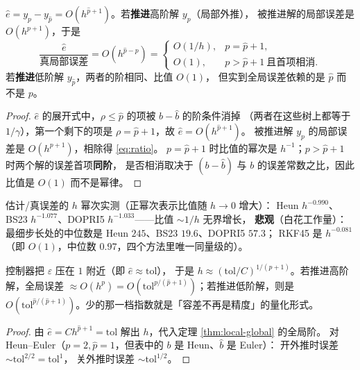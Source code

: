 \begin{theorem}[估计量估的是谁]
\label{thm:estimator-order}
$\hat e=y_p-y_{\hat p}=O(h^{\hat p+1})$。若\textbf{推进}高阶解 $y_p$（局部外推），
被推进解的局部误差是 $O(h^{p+1})$，于是
\begin{equation}
  \frac{\hat e}{\text{真局部误差}}=O(h^{\hat p-p})=
  \begin{cases}O(1/h),& p=\hat p+1,\\ O(1),& p>\hat p+1\ \text{且首项相消}.\end{cases}
  \label{eq:ratio}
\end{equation}
若\textbf{推进}低阶解 $y_{\hat p}$，两者的阶相同、比值 $O(1)$，
但实到全局误差依赖的是 $\hat p$ 而不是 $p$。
\end{theorem}

\begin{proof}
$\hat e$ 的展开式中，$\rho\le\hat p$ 的项被 $b-\hat b$ 的阶条件消掉
（两者在这些树上都等于 $1/\gamma$），第一个剩下的项是 $\rho=\hat p+1$，故 $\hat e=O(h^{\hat p+1})$。
被推进解 $y_p$ 的局部误差是 $O(h^{p+1})$，相除得 \eqref{eq:ratio}。
$p=\hat p+1$ 时比值的幂次是 $h^{-1}$；$p>\hat p+1$ 时两个解的误差首项\textbf{同阶}，
是否相消取决于 $(b-\hat b)$ 与 $b$ 的误差常数之比，因此比值是 $O(1)$ 而不是幂律。
\end{proof}

\begin{remark}[实测：两种比值]
估计/真误差的 $h$ 幂次实测（正幂次表示比值随 $h\to0$ 增大）：
Heun $h^{-0.990}$、BS23 $h^{-1.077}$、DOPRI5 $h^{-1.033}$——比值 $\sim1/h$ 无界增长，
\textbf{悲观}（白花工作量）：最细步长处的中位数是 Heun $245$、BS23 $19.6$、DOPRI5 $57.3$；
RKF45 是 $h^{-0.081}$（即 $O(1)$，中位数 $0.97$，四个方法里唯一同量级的）。
\end{remark}

\begin{theorem}
\label{thm:tol-scaling}
控制器把 $\varepsilon$ 压在 $1$ 附近（即 $\hat e\approx\mathrm{tol}$），
于是 $h\approx(\mathrm{tol}/C)^{1/(\hat p+1)}$。若推进高阶解，全局误差
$\approx O(h^{p})=O(\mathrm{tol}^{p/(\hat p+1)})$；若推进低阶解，则是
$O(\mathrm{tol}^{\hat p/(\hat p+1)})$。少的那一档指数就是「容差不再是精度」的量化形式。
\end{theorem}

\begin{proof}
由 $\hat e=Ch^{\hat p+1}=\mathrm{tol}$ 解出 $h$，代入定理 \ref{thm:local-global} 的全局阶。
对 Heun--Euler（$p=2,\hat p=1$，但表中的 $b$ 是 Heun、$\hat b$ 是 Euler）：
开外推时误差 $\sim\mathrm{tol}^{2/2}=\mathrm{tol}^1$，
关外推时误差 $\sim\mathrm{tol}^{1/2}$。
\end{proof}

